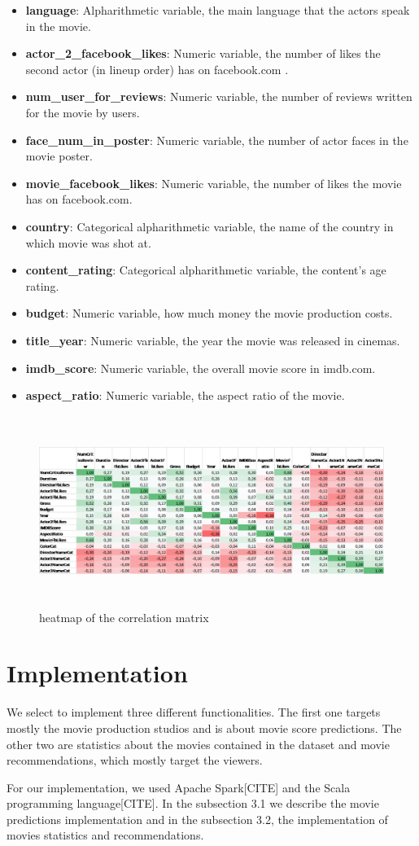 \documentclass[letterpaper,twocolumn,10pt]{article}
\begin{document}
\begin{itemize}
\item \textbf{language}: Alpharithmetic variable, the main language that the actors speak in the movie.
\item \textbf{actor\_2\_facebook\_likes}: Numeric variable, the number of likes the second actor (in lineup order) has on facebook.com . 
\item \textbf{num\_user\_for\_reviews}: Numeric variable, the number of reviews written for the movie by users.
\item \textbf{face\_num\_in\_poster}: Numeric variable, the number of actor faces in the movie poster.
\item \textbf{movie\_facebook\_likes}: Numeric variable, the number of likes the movie has on facebook.com.
\item \textbf{country}: Categorical alpharithmetic variable, the name of the country in which movie was shot at.
\item \textbf{content\_rating}:  Categorical alpharithmetic variable, the content's age rating.
\item \textbf{budget}: Numeric variable, how much money the movie production costs.
\item \textbf{title\_year}: Numeric variable, the year the movie was released in cinemas.
\item \textbf{imdb\_score}: Numeric variable, the overall movie score in imdb.com.
\item \textbf{aspect\_ratio}: Numeric variable, the aspect ratio of the movie.
\end{itemize}

\begin{figure}	
	\includegraphics[width = \textwidth,height=6.2cm]{correlation_matrix_image}
	\caption{heatmap of the correlation matrix}
\end{figure}

\section{Implementation}
We select to implement three different functionalities. The first one targets mostly the movie production studios and is about movie score predictions. The other two are statistics about the movies contained in the dataset and movie recommendations, which mostly target the viewers. 
\par For our implementation, we used Apache Spark[CITE] and the Scala programming language[CITE]. In the subsection 3.1 we describe the movie predictions implementation and in the subsection 3.2, the implementation of movies statistics and recommendations.
\end{document}
